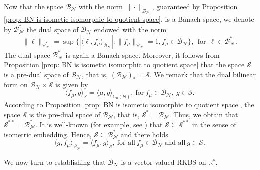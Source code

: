 \documentclass[11pt]{article}
\begin{document}
Now that the space $\mathcal{B}_{\mathcal{N}}$ with the norm $\|\cdot\|_{\mathcal{B}_{\mathcal{N}}}$, guaranteed by Proposition \ref{prop: BN is isometic isomorphic to quotient space}, is a Banach space, we denote by $\mathcal{B}_{\mathcal{N}}^*$ the dual space of $\mathcal{B}_{\mathcal{N}}$ endowed with the norm  
\begin{equation}\label{norm of BN*}
    \|\ell\|_{\mathcal{B}_{\mathcal{N}}^*}=\sup\{|\langle\ell,f_\mu\rangle_{\mathcal{B}_{\mathcal{N}}}|:\|f_\mu\|_{\mathcal{B}_{\mathcal{N}}}=1, f_\mu\in\mathcal{B}_{\mathcal{N}}\}, \ \ \mbox{for}\ \ \ell\in \mathcal{B}_{\mathcal{N}}^*.
\end{equation} 
The dual space  $\mathcal{B}_{\mathcal{N}}^*$ is again a Banach space.
Moreover, it follows from Proposition \ref{prop: BN is isometic isomorphic to quotient space} that the space $\mathcal{S}$ is a pre-dual space of $\mathcal{B}_{\mathcal{N}}$, that is, 
$(\mathcal{B}_{\mathcal{N}})_*=\mathcal{S}.$
We remark that the dual bilinear form on $\mathcal{B}_{\mathcal{N}}\times\mathcal{S}$ is given by
\begin{equation}\label{dual bilinear on BNS}
\langle f_{\mu}, g\rangle_{\mathcal{S}}=\langle\mu, g\rangle_{C_0(\Theta)}, \ \mbox{for}\ f_{\mu}\in\mathcal{B}_{\mathcal{N}},\ g\in \mathcal{S}.
\end{equation}
According to Proposition \ref{prop: BN is isometic isomorphic to quotient space}, the space $\mathcal{S}$ is the pre-dual space of $\mathcal{B}_{\mathcal{N}}$, that is,
$\mathcal{S}^*=\mathcal{B}_{\mathcal{N}}$.
Thus, we obtain that $\mathcal{S}^{**}=\mathcal{B}_{\mathcal{N}}^*$.
It is well-known (for example, see \cite{conway2019course}) that $\mathcal{S}\subseteq \mathcal{S}^{**}$ in the sense of isometric embedding.
%
Hence,   $\mathcal{S}\subseteq \mathcal{B}_{\mathcal{N}}^*$ and there holds 
\begin{equation}\label{natural-map-predual}
\langle g,f_{\mu}\rangle_{\mathcal{B}_{\mathcal{N}}}=\langle f_{\mu},g\rangle_{\mathcal{S}},
\ \mbox{for all} \ f_{\mu}\in \mathcal{B}_{\mathcal{N}} \ \mbox{and all} \ g\in \mathcal{S}.
\end{equation} 


We now turn to establishing that $\mathcal{B}_{\mathcal{N}}$ is a vector-valued RKBS on $\mathbb{R}^s$.
\end{document}
